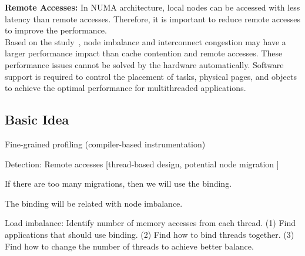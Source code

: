 \textbf{Remote Accesses:} In NUMA architecture, local nodes can be accessed with less latency than remote accesses. Therefore, it is important to reduce remote accesses to improve the performance.\\


 Based on the study~\cite{Blagodurov:2011:CNC:2002181.2002182}, node imbalance and interconnect congestion may have a larger performance impact than cache contention and remote accesses. These performance issues cannot be solved by the hardware automatically. Software support is required to control the placement of tasks, physical pages, and objects to achieve the optimal performance for multithreaded applications.  
 
\subsection{Basic Idea}

Fine-grained profiling (compiler-based instrumentation) 

Detection: 
Remote accesses [thread-based design, potential node migration ]

If there are too many migrations, then we will use the binding. 

The binding will be related with node imbalance. 

Load imbalance: 
Identify number of memory accesses from each thread. 
(1) Find applications that should use binding. 
(2) Find how to bind threads together. 
(3) Find how to change the number of threads to achieve better balance. 

